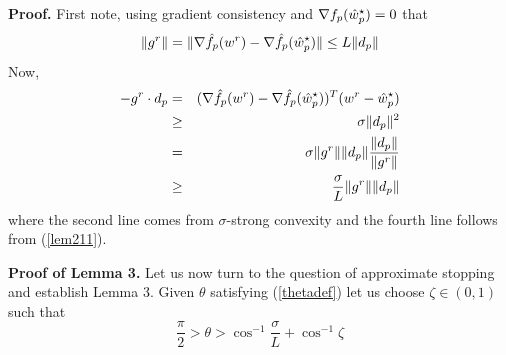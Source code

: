 {\bf Proof.} First note, using gradient consistency and $\nabla f_p(\hat{w}_p^\star)=0$ that
\begin{equation}
\|g^r\| = \| \nabla \hat{f}_p(w^r)-\nabla \hat{f}_p(\hat{w}_p^\star) \| \le L\|d_p\|
\label{lem211}
\end{equation}
Now,
\begin{eqnarray}
-g^r\cdot d_p &=&(\nabla \hat{f}_p(w^r)-\nabla \hat{f}_p(\hat{w}_p^\star))^T(w^r-\hat{w}_p^\star) \nonumber \\
            &\ge& \sigma \|d_p\|^2 \nonumber \\
            &=& \sigma \|g^r\| \|d_p\| \frac{\|d_p\|}{\|g^r\|} \nonumber \\
            &\ge& \frac{\sigma}{L} \|g^r\| \|d_p\|
\label{lem212}
\end{eqnarray}
where the second line comes from $\sigma$-strong convexity and the fourth line follows from (\ref{lem211}).

{\bf Proof of Lemma 3.}
Let us now turn to the question of approximate stopping and establish Lemma 3. Given $\theta$ satisfying (\ref{thetadef}) let us choose $\zeta\in (0,1)$ such that
\begin{equation}
\label{lem2211}
\frac{\pi}{2} > \theta > \cos^{-1} \frac{\sigma}{L} + \cos^{-1} \zeta
\end{equation}



